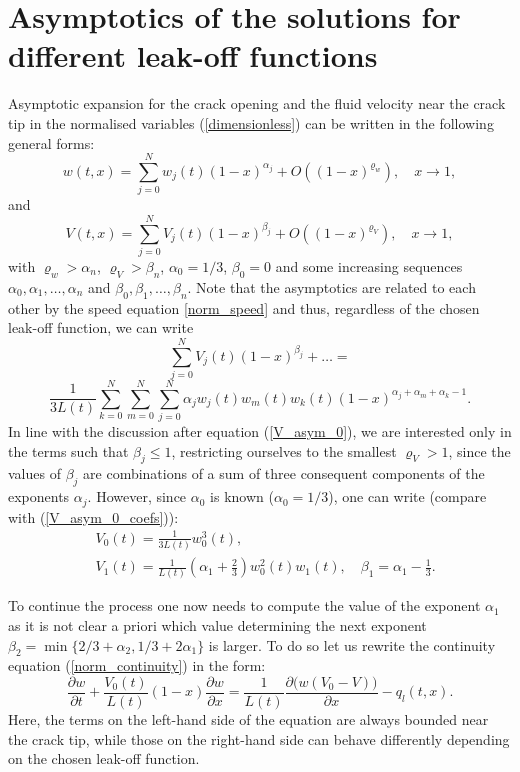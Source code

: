 \section{Asymptotics of the solutions for different leak-off functions} \label{app:C}


Asymptotic expansion for the crack opening and the fluid velocity near the crack tip in the normalised variables (\ref{dimensionless}) can be written in the following general forms:
\begin{equation}\label{w_asym}
w(t, x)=\sum_{j=0}^Nw_j(t)(1-x)^{\alpha_j}+O((1- x)^{\varrho_w}), \quad x\rightarrow 1,
\end{equation}
and
\begin{equation}\label{v_asym}
V(t, x)=\sum_{j=0}^NV_j(t)(1-x)^{\beta_j}+O((1- x)^{\varrho_V}),\quad  x\rightarrow 1,
\end{equation}
with $\varrho_w>\alpha_n$, $\varrho_V>\beta_n$, $\alpha_0=1/3$, $\beta_0=0$ and some increasing sequences $\alpha_0,\alpha_1,\ldots,\alpha_n$ and $\beta_0,\beta_1,\ldots,\beta_n$. Note that the asymptotics are related to each other by the speed equation \eqref{norm_speed} and thus, regardless of the chosen leak-off function, we can write
\begin{equation}\label{v_asym_1}
\sum_{j=0}^NV_j(t)(1-x)^{\beta_j}+\ldots=
\end{equation}
\[
\frac{1}{3L(t)}\sum_{k=0}^N\sum_{m=0}^N\sum_{j=0}^N\alpha_jw_j(t)
w_m(t)w_k(t)(1-x)^{\alpha_j+\alpha_m+\alpha_k-1}.
\]
In line with the discussion after equation (\ref{V_asym_0}),
we are interested only in the terms such that $\beta_j\le1$, restricting ourselves to the smallest $\varrho_V>1$,
since the values of $\beta_j$ are combinations of a sum of three consequent components of the exponents $\alpha_j$.
However, since $\alpha_0$ is known ($\alpha_0=1/3$), one can write (compare with (\ref{V_asym_0_coefs})):
\begin{align}
& V_{0}(t)=\frac{1}{3L(t)}w_{0}^{3}(t)\label{v_0}, \\
& V_{1}(t)=\frac{1}{L(t)}\left(\alpha_1+\frac{2}{3}\right) w_{0}^{2}(t) w_{1}(t),\quad \beta_1=\alpha_1-\frac{1}{3}.\label{v_1}
\end{align}

To continue the process one now needs to compute the value of the exponent $\alpha_1$ as it is not clear 
a priori which value determining the next exponent $\beta_2=\min\{2/3+\alpha_2,1/3+2\alpha_1\}$ is larger. To do so
let us rewrite the continuity equation (\ref{norm_continuity}) in the form:
\begin{equation}
\label{norm_continuity_as}
\frac{\partial w}{\partial t}+\frac{V_0(t)}{L( t)}(1-x)\frac{\partial w}{\partial x}=\frac{1}{L( t)}\frac{\partial \big(w(V_0-V)\big)}{\partial x}-q_l(t,x).
\end{equation}
Here, the terms on the left-hand side of the equation are always bounded near the crack tip, while those on the right-hand side can behave differently depending on the chosen leak-off function.


